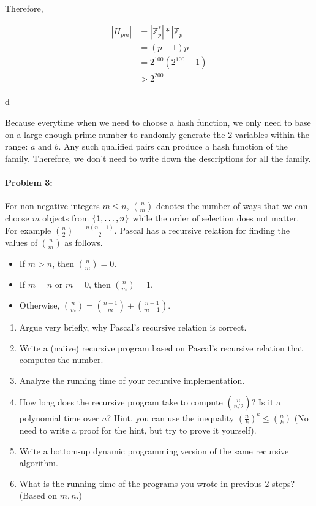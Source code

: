 \documentclass{article}
\begin{document}
\paragraph{}
Therefore,

$$\begin{aligned}
|H_{pm}| &= |\mathbb{Z}^{*}_p| * |\mathbb{Z}_p|\\
&=(p-1)p\\
&=2^{100}(2^{100}+1)\\
&>2^{200}
\end{aligned}$$

\paragraph{}
d

Because everytime when we need to choose a hash function, we only need to base on a large enough prime number to randomly generate the $2$ variables within the range: $a$ and $b$. Any such qualified pairs can produce a hash function of the family. Therefore, we don't need to write down the descriptions for all the family.

\newpage
\paragraph{Problem 3:}
For non-negative integers $m\leq n$, ${n \choose m}$ denotes the number of ways that we can choose $m$ objects from $\{ 1,\dots,n \}$ while the order of selection does not matter. For example ${n \choose 2} = \frac{n (n-1)}{2}$.
Pascal has a recursive relation for finding the values of ${n \choose m}$ as follows.
\begin{itemize}
    \item If $m > n$, then ${n \choose m}=0$.
    \item If $m =n$ or $m=0$, then ${n \choose m}=1$.
    \item Otherwise, ${n \choose m} = {n-1 \choose m} + {n-1 \choose m-1}$.
\end{itemize}


\begin{enumerate}[label=\alph*]
\item Argue very briefly, why Pascal's recursive relation is correct.
\item Write a (naiive) recursive program based on Pascal's recursive relation that computes the number.
\item Analyze the running time of your recursive implementation.
\item How long does the recursive program take to compute ${n \choose n/2}$? Is it a polynomial time over $n$? Hint, you can use the inequality $(\frac{n}{k})^k \leq {n \choose k}$ (No need to write a proof for the hint, but try to prove it yourself).
\item Write a bottom-up dynamic programming version of the same recursive algorithm.
\item What is the running time of the programs you wrote in previous 2 steps? (Based on $m,n$.)
\end{enumerate}
\end{document}
